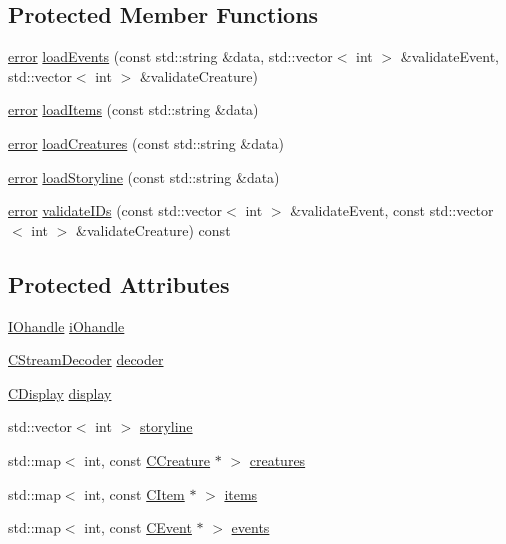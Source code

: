 \subsection*{Protected Member Functions}
\begin{DoxyCompactItemize}
\item 
\mbox{\hyperlink{_errors_list_8h_af10dacfa214e2575bb2e0ee407c242e0}{error}} \mbox{\hyperlink{class_c_world_afa6876cb4b0d0aa9aec88fec6c596634}{load\+Events}} (const std\+::string \&data, std\+::vector$<$ int $>$ \&validate\+Event, std\+::vector$<$ int $>$ \&validate\+Creature)
\item 
\mbox{\hyperlink{_errors_list_8h_af10dacfa214e2575bb2e0ee407c242e0}{error}} \mbox{\hyperlink{class_c_world_abb7ab3f5626b424ebabbd4aec3b60b5a}{load\+Items}} (const std\+::string \&data)
\item 
\mbox{\hyperlink{_errors_list_8h_af10dacfa214e2575bb2e0ee407c242e0}{error}} \mbox{\hyperlink{class_c_world_a313cf7258bfab897ada813aa0f8837ac}{load\+Creatures}} (const std\+::string \&data)
\item 
\mbox{\hyperlink{_errors_list_8h_af10dacfa214e2575bb2e0ee407c242e0}{error}} \mbox{\hyperlink{class_c_world_a6a4774ff3ee94df11d82260a27065885}{load\+Storyline}} (const std\+::string \&data)
\item 
\mbox{\hyperlink{_errors_list_8h_af10dacfa214e2575bb2e0ee407c242e0}{error}} \mbox{\hyperlink{class_c_world_a5220755d94cacc872e0f5ae0e7e55eb6}{validate\+I\+Ds}} (const std\+::vector$<$ int $>$ \&validate\+Event, const std\+::vector$<$ int $>$ \&validate\+Creature) const
\end{DoxyCompactItemize}
\subsection*{Protected Attributes}
\begin{DoxyCompactItemize}
\item 
\mbox{\hyperlink{class_i_ohandle}{I\+Ohandle}} \mbox{\hyperlink{class_c_world_aececaddab106e7d36d438f17b9ec1ba9}{i\+Ohandle}}
\item 
\mbox{\hyperlink{class_c_stream_decoder}{C\+Stream\+Decoder}} \mbox{\hyperlink{class_c_world_affc2da4807829a42a991fa7f8cba7c27}{decoder}}
\item 
\mbox{\hyperlink{class_c_display}{C\+Display}} \mbox{\hyperlink{class_c_world_a79fe0ec8494e4e1d42fc82e36904d517}{display}}
\item 
std\+::vector$<$ int $>$ \mbox{\hyperlink{class_c_world_a57cb7b4ee9c9f8070eba90cfbd0717ed}{storyline}}
\item 
std\+::map$<$ int, const \mbox{\hyperlink{class_c_creature}{C\+Creature}} $\ast$ $>$ \mbox{\hyperlink{class_c_world_a58749fe58efd9258a7979566de208358}{creatures}}
\item 
std\+::map$<$ int, const \mbox{\hyperlink{class_c_item}{C\+Item}} $\ast$ $>$ \mbox{\hyperlink{class_c_world_aef07829b9e53bf45fcf88e368ce1c471}{items}}
\item 
std\+::map$<$ int, const \mbox{\hyperlink{class_c_event}{C\+Event}} $\ast$ $>$ \mbox{\hyperlink{class_c_world_a21950e7420b123b79421457060ebaf60}{events}}
\end{DoxyCompactItemize}


